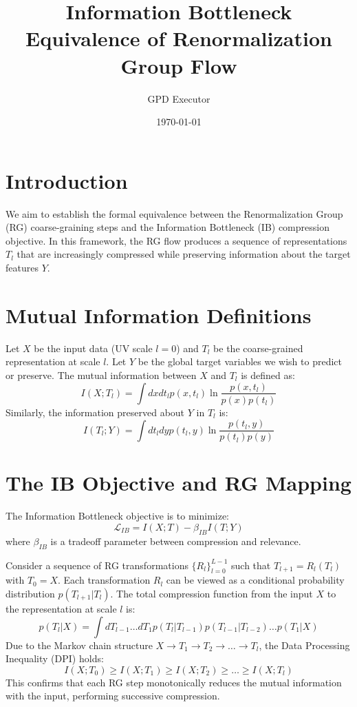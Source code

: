 \documentclass{article}
\title{Information Bottleneck Equivalence of Renormalization Group Flow}
\author{GPD Executor}
\date{\today}
\begin{document}
\maketitle

\section{Introduction}
We aim to establish the formal equivalence between the Renormalization Group (RG) coarse-graining steps and the Information Bottleneck (IB) compression objective. In this framework, the RG flow produces a sequence of representations $T_l$ that are increasingly compressed while preserving information about the target features $Y$.

\section{Mutual Information Definitions}
Let $X$ be the input data (UV scale $l=0$) and $T_l$ be the coarse-grained representation at scale $l$. Let $Y$ be the global target variables we wish to predict or preserve. The mutual information between $X$ and $T_l$ is defined as:
\begin{equation}
    I(X; T_l) = \int dx dt_l p(x, t_l) \ln \frac{p(x, t_l)}{p(x) p(t_l)}
\end{equation}
Similarly, the information preserved about $Y$ in $T_l$ is:
\begin{equation}
    I(T_l; Y) = \int dt_l dy p(t_l, y) \ln \frac{p(t_l, y)}{p(t_l) p(y)}
\end{equation}

\section{The IB Objective and RG Mapping}
The Information Bottleneck objective is to minimize:
\begin{equation}
    \mathcal{L}_{IB} = I(X; T) - \beta_{IB} I(T; Y)
\end{equation}
where $\beta_{IB}$ is a tradeoff parameter between compression and relevance.

Consider a sequence of RG transformations $\{R_l\}_{l=0}^{L-1}$ such that $T_{l+1} = R_l(T_l)$ with $T_0 = X$. Each transformation $R_l$ can be viewed as a conditional probability distribution $p(T_{l+1}|T_l)$. The total compression function from the input $X$ to the representation at scale $l$ is:
\begin{equation}
    p(T_l | X) = \int dT_{l-1} \dots dT_1 p(T_l | T_{l-1}) p(T_{l-1} | T_{l-2}) \dots p(T_1 | X)
\end{equation}
Due to the Markov chain structure $X \to T_1 \to T_2 \to \dots \to T_l$, the Data Processing Inequality (DPI) holds:
\begin{equation}
    I(X; T_0) \geq I(X; T_1) \geq I(X; T_2) \geq \dots \geq I(X; T_l)
\end{equation}
This confirms that each RG step monotonically reduces the mutual information with the input, performing successive compression.
\end{document}
